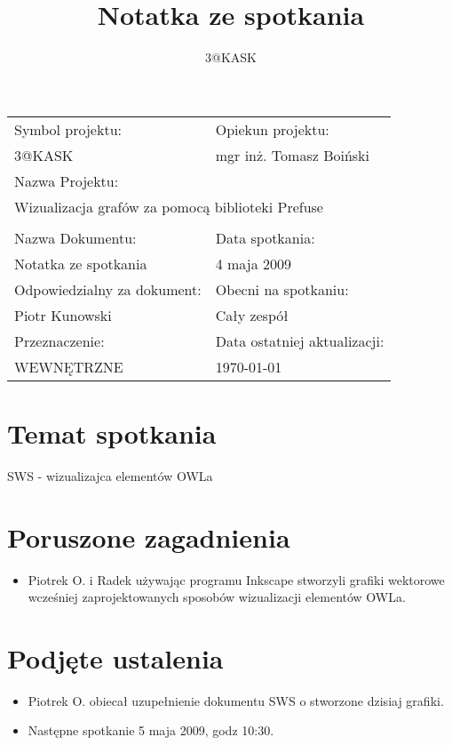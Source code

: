 \documentclass[a4paper,10pt]{article}
\title{Notatka ze spotkania}
\author{3@KASK}
\begin{document}



\maketitle


\begin{center}
\begin{tabular}{|p{7cm}|p{7cm}|}
\hline
Symbol projektu: & Opiekun projektu:   \tabularnewline 
3@KASK & mgr inż. Tomasz Boiński    \tabularnewline \hline
\multicolumn{2}{|l|}{Nazwa Projektu: } \tabularnewline
\multicolumn{2}{|l|}{Wizualizacja grafów za pomocą biblioteki Prefuse } \tabularnewline 
\hline
\multicolumn{2}{l}{ } \tabularnewline %
\hline 
Nazwa Dokumentu: & Data spotkania:   \tabularnewline 
Notatka ze spotkania & 4 maja 2009 \tabularnewline \hline
Odpowiedzialny za dokument: & Obecni na spotkaniu:   \tabularnewline 
Piotr Kunowski & Cały zespół \tabularnewline \hline
Przeznaczenie: & Data ostatniej aktualizacji:   \tabularnewline 
WEWNĘTRZNE & \today \tabularnewline \hline
\end{tabular}
\end{center}



\section{Temat spotkania}
SWS - wizualizajca elementów OWLa
\section{Poruszone zagadnienia}
\begin{itemize}
 \item Piotrek O. i Radek używając programu Inkscape stworzyli grafiki wektorowe wcześniej zaprojektowanych sposobów wizualizacji elementów OWLa.


\end{itemize}

\section{Podjęte ustalenia}
\begin{itemize}
 \item Piotrek O. obiecał uzupełnienie dokumentu SWS o stworzone dzisiaj grafiki.
\item Następne spotkanie 5 maja 2009, godz 10:30. 


\end{itemize}



%
\end{document}
